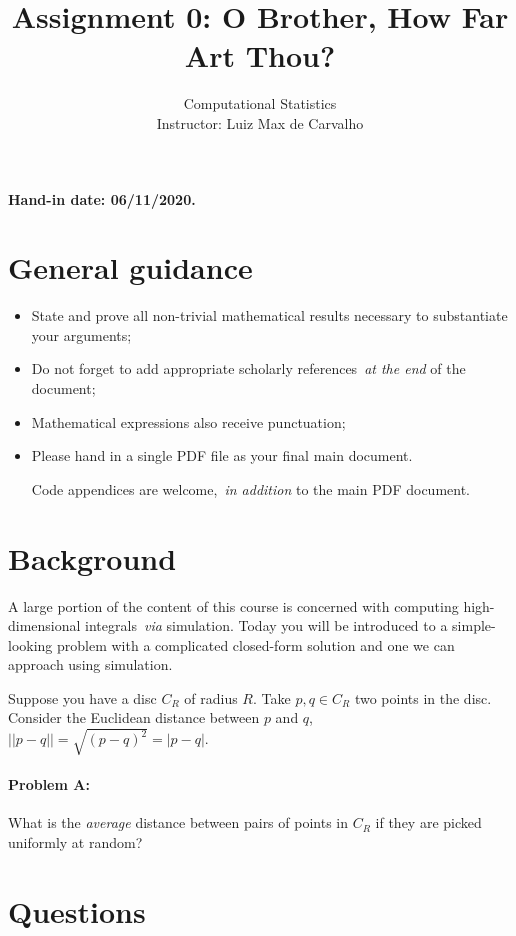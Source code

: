 \documentclass[a4paper,10pt, notitlepage]{report}
\title{Assignment 0: O Brother, How Far Art Thou?}
\author{Computational Statistics \\ Instructor: Luiz Max de Carvalho}
\begin{document}
\maketitle

\textbf{Hand-in date: 06/11/2020.}

\section*{General guidance}
\begin{itemize}
 \item State and prove all non-trivial mathematical results necessary to substantiate your arguments;
 \item Do not forget to add appropriate scholarly references~\textit{at the end} of the document;
 \item Mathematical expressions also receive punctuation;
 \item Please hand in a single PDF file as your final main document.
 
 Code appendices are welcome,~\textit{in addition} to the main PDF document.
 \end{itemize}

\newpage

\section*{Background}

A large portion of the content of this course is concerned with computing high-dimensional integrals~\textit{via} simulation.
Today you will be introduced to a simple-looking problem with a complicated closed-form solution and one we can approach using simulation.

Suppose you have a disc $C_R$ of radius $R$. 
Take $p, q \in C_R$ two points in the disc.  
Consider the Euclidean distance between $p$  and $q$, $||p-q|| = \sqrt{(p-q)^2} = |p-q|$.
\paragraph{Problem A:} What is the \textit{average} distance between pairs of points in $C_R$ if they are picked uniformly at random?

\section*{Questions}
\end{document}
